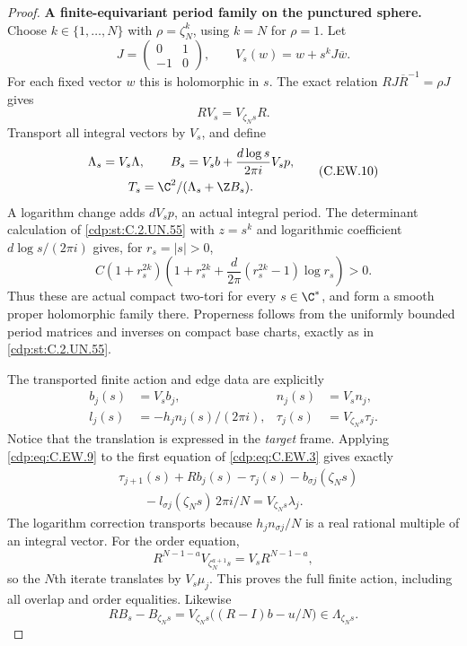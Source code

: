 \begin{proof}
\par\medskip\noindent\textbf{A finite-equivariant period family on the punctured sphere.}
Choose $k\in\{1,\ldots,N\}$ with
$\rho=\zeta_N^k$, using $k=N$ for $\rho=1$.
Let
\[
 J=\begin{pmatrix}0&1\\-1&0\end{pmatrix},\qquad
 V_s(w)=w+s^kJ\overline w.
\tag{C.EW.8}\label{cdp:eq:C.EW.8}
\]
For each fixed vector $w$ this is holomorphic in $s$.
The exact relation $RJ\overline R^{-1}=\rho J$
gives
\[
                           R V_s=V_{\zeta_Ns}R.
\tag{C.EW.9}\label{cdp:eq:C.EW.9}
\]
Transport all integral vectors by $V_s$, and define
\[
 \begin{gathered}
 \Lambda_s=V_s\Lambda,\qquad
 B_s=V_s b+\frac{d\log s}{2\pi i}V_s p,\\
                         T_s=\C^2/(\Lambda_s+\Z B_s).
 \end{gathered}
\tag{C.EW.10}\label{cdp:eq:C.EW.10}
\]
A logarithm change adds $dV_s p$, an actual integral
period. The determinant calculation of \ref{cdp:st:C.2.UN.55} with
$z=s^k$ and logarithmic coefficient $d\log s/(2\pi i)$
gives, for $r_s=|s|>0$,
\[
 C(1+r_s^{2k})
 \left(1+r_s^{2k}
       +\frac d{2\pi}(r_s^{2k}-1)\log r_s\right)>0.
\tag{C.EW.11}\label{cdp:eq:C.EW.11}
\]
Thus these are actual compact two-tori for every
$s\in\C^*$, and form a smooth proper holomorphic
family there. Properness follows from the uniformly
bounded period matrices and inverses on compact
base charts, exactly as in \ref{cdp:st:C.2.UN.55}.

The transported finite action and edge data are explicitly
\[
 \begin{aligned}
 b_j(s)&=V_s b_j,& n_j(s)&=V_s n_j,\\
 l_j(s)&=-h_jn_j(s)/(2\pi i),&
 \tau_j(s)&=V_{\zeta_Ns}\tau_j.
 \end{aligned}
\tag{C.EW.12}\label{cdp:eq:C.EW.12}
\]
Notice that the translation is expressed in the
\emph{target} frame. Applying \eqref{cdp:eq:C.EW.9} to the first
equation of \eqref{cdp:eq:C.EW.3} gives exactly
\[
 \begin{aligned}
 &\tau_{j+1}(s)+Rb_j(s)-\tau_j(s)-b_{\sigma j}(\zeta_Ns)\\
 &\qquad-l_{\sigma j}(\zeta_Ns)\,2\pi i/N
       =V_{\zeta_Ns}\lambda_j.
 \end{aligned}
\tag{C.EW.13}\label{cdp:eq:C.EW.13}
\]
The logarithm correction transports because
$h_jn_{\sigma j}/N$ is a real rational multiple
of an integral vector. For the order equation,
\[
 R^{N-1-a}V_{\zeta_N^{a+1}s}
                         =V_sR^{N-1-a},
\]
so the $N$th iterate translates by $V_s\mu_j$.
This proves the full finite action, including all
overlap and order equalities. Likewise
\[
                    R B_s-B_{\zeta_Ns}
                   =V_{\zeta_Ns}\bigl((R-I)b-u/N\bigr)
                   \in\Lambda_{\zeta_Ns}.
\tag{C.EW.14}\label{cdp:eq:C.EW.14}
\]


\end{proof}
